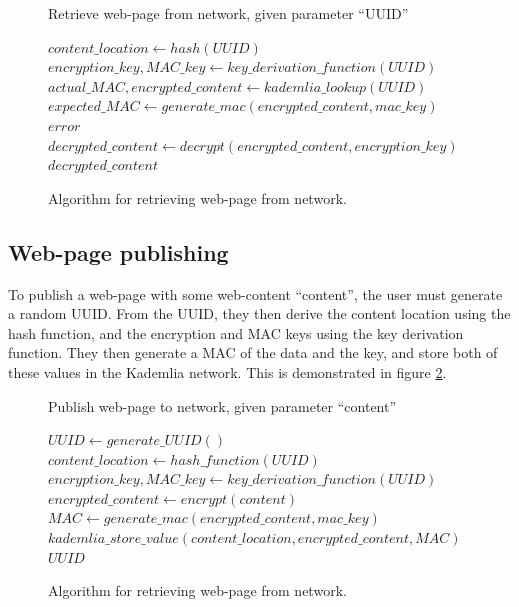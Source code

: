 \begin{figure}
    \begin{algorithm}[H]
    \caption{Retrieve web-page from network, given parameter ``UUID''}
    \begin{algorithmic}
        \STATE $content\_location \leftarrow hash(UUID)$
        \STATE $encryption\_key, MAC\_key \leftarrow key\_derivation\_function(UUID) $
        \STATE $actual\_MAC, encrypted\_content \leftarrow kademlia\_lookup(UUID) $
        \STATE $expected\_MAC \leftarrow generate\_mac(encrypted\_content, mac\_key) $
        \RETURN $ error $
        \ENDIF
        \STATE $ decrypted\_content \leftarrow decrypt(encrypted\_content, encryption\_key) $
        \RETURN $ decrypted\_content $
    \end{algorithmic}
    \end{algorithm}
    \caption{Algorithm for retrieving web-page from network.}
    \label{fig:retrievalalgo}
\end{figure}

\subsection{Web-page publishing}

To publish a web-page with some web-content ``content'', the user must generate a random UUID. From the UUID, they
then derive the content location using the hash function, and the encryption and MAC keys using the key derivation function.
They then generate a MAC of the data and the key, and store both of these values in the Kademlia network. This is demonstrated in
figure \ref{fig:publishalgo}.

\begin{figure}
    \begin{algorithm}[H]
        \caption{Publish web-page to network, given parameter ``content''}
        \begin{algorithmic}
        \STATE $ UUID \leftarrow generate\_UUID() $
        \STATE $ content\_location \leftarrow hash\_function(UUID) $
        \STATE $ encryption\_key, MAC\_key \leftarrow key\_derivation\_function(UUID) $
        \STATE $ encrypted\_content \leftarrow encrypt(content) $
        \STATE $ MAC \leftarrow generate\_mac(encrypted\_content, mac\_key) $
        \STATE $ kademlia\_store\_value(content\_location, encrypted\_content, MAC) $
        \RETURN $ UUID $
        \end{algorithmic}
    \end{algorithm}
    \caption{Algorithm for retrieving web-page from network.}
    \label{fig:publishalgo}
\end{figure}

